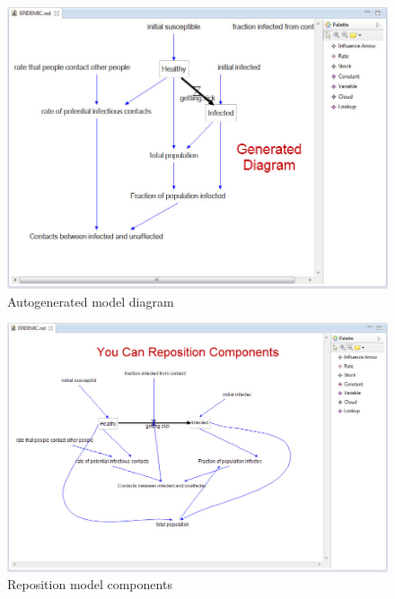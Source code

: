 \documentclass[11pt]{amsart}
\begin{document}
\begin{figure}[ht]
\begin{center}
\vspace{.2in}
\centerline {
\includegraphics[totalheight=0.3\textheight]{images/047.jpg}
}
\caption{Autogenerated model diagram}
\label{fig:047}
\end{center}
\end{figure}




\begin{figure}[ht]
\begin{center}
\vspace{.2in}
\centerline {
\includegraphics[totalheight=0.3\textheight]{images/048.jpg}
}
\caption{Reposition model components}
\label{fig:048}
\end{center}
\end{figure}
\end{document}

